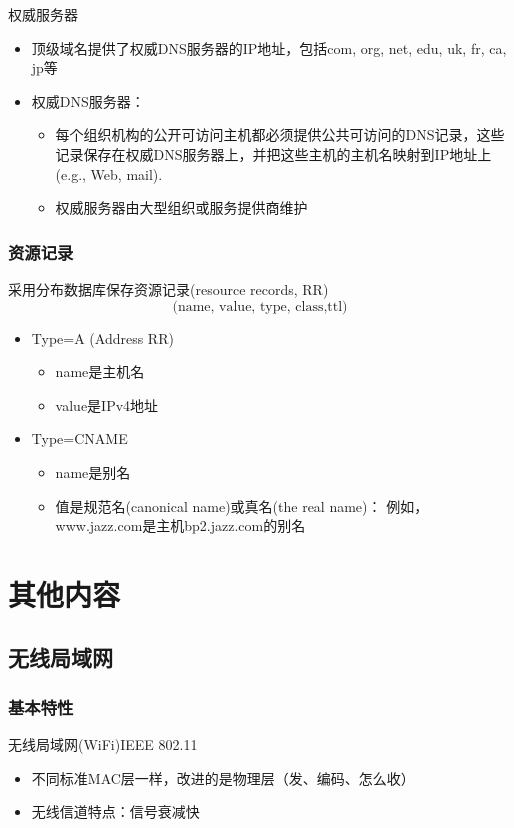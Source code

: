 \myhline
权威服务器
\begin{itemize}
\item 顶级域名提供了权威DNS服务器的IP地址，包括com, org, net, edu, uk, fr, ca, jp等
\item 权威DNS服务器：
\begin{itemize}
\item 每个组织机构的公开可访问主机都必须提供公共可访问的DNS记录，这些记录保存在权威DNS服务器上，并把这些主机的主机名映射到IP地址上(e.g., Web, mail).
\item 权威服务器由大型组织或服务提供商维护
\end{itemize}
\end{itemize}

\subsubsection{资源记录}
采用分布数据库保存资源记录(resource records, RR)
\[\text{(name, value, type, class,ttl)}\]
\begin{itemize}
\item Type=A (Address RR)
\begin{itemize}
\item name是主机名
\item value是IPv4地址
\end{itemize}
\item Type=CNAME
\begin{itemize}
\item name是别名
\item 值是规范名(canonical name)或真名(the real name)：
例如， www.jazz.com是主机bp2.jazz.com的别名
\end{itemize}
\end{itemize}

\section{其他内容}
\subsection{无线局域网}
\subsubsection{基本特性}
无线局域网(WiFi)IEEE 802.11
\begin{itemize}
\item 不同标准MAC层一样，改进的是物理层（发、编码、怎么收）
\item 无线信道特点：信号衰减快
\end{itemize}

